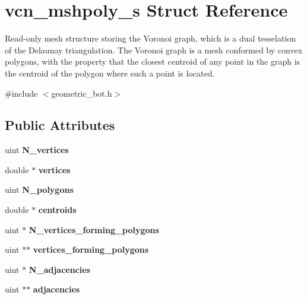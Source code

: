 \hypertarget{structvcn__mshpoly__s}{\section{vcn\+\_\+mshpoly\+\_\+s Struct Reference}
\label{structvcn__mshpoly__s}
}


Read-\/only mesh structure storing the Voronoi graph, which is a dual tesselation of the Delaunay triangulation. The Voronoi graph is a mesh conformed by convex polygons, with the property that the closest centroid of any point in the graph is the centroid of the polygon where such a point is located.  




{\ttfamily \#include $<$geometric\+\_\+bot.\+h$>$}

\subsection*{Public Attributes}
\begin{DoxyCompactItemize}
\item 
\hypertarget{structvcn__mshpoly__s_ab2dc55f45831c2180482884f27f10b10}{uint {\bfseries N\+\_\+vertices}}\label{structvcn__mshpoly__s_ab2dc55f45831c2180482884f27f10b10}

\item 
\hypertarget{structvcn__mshpoly__s_a8d7275ce0a1675389482fb06f8fa564c}{double $\ast$ {\bfseries vertices}}\label{structvcn__mshpoly__s_a8d7275ce0a1675389482fb06f8fa564c}

\item 
\hypertarget{structvcn__mshpoly__s_ad561705ab311c24ee82e131fcaf17573}{uint {\bfseries N\+\_\+polygons}}\label{structvcn__mshpoly__s_ad561705ab311c24ee82e131fcaf17573}

\item 
\hypertarget{structvcn__mshpoly__s_a772256fc6e3ab573a74f5ca8bd1e6134}{double $\ast$ {\bfseries centroids}}\label{structvcn__mshpoly__s_a772256fc6e3ab573a74f5ca8bd1e6134}

\item 
\hypertarget{structvcn__mshpoly__s_a32359f244d0be09a254ddd2b4334519b}{uint $\ast$ {\bfseries N\+\_\+vertices\+\_\+forming\+\_\+polygons}}\label{structvcn__mshpoly__s_a32359f244d0be09a254ddd2b4334519b}

\item 
\hypertarget{structvcn__mshpoly__s_ab7b6c4c0c6d47a6e6ebd9547824f2e36}{uint $\ast$$\ast$ {\bfseries vertices\+\_\+forming\+\_\+polygons}}\label{structvcn__mshpoly__s_ab7b6c4c0c6d47a6e6ebd9547824f2e36}

\item 
\hypertarget{structvcn__mshpoly__s_a576204c105e386af89132e8d0a8b6bbd}{uint $\ast$ {\bfseries N\+\_\+adjacencies}}\label{structvcn__mshpoly__s_a576204c105e386af89132e8d0a8b6bbd}

\item 
\hypertarget{structvcn__mshpoly__s_aee68d886d01d07dbf52ef0bef740f9e6}{uint $\ast$$\ast$ {\bfseries adjacencies}}\label{structvcn__mshpoly__s_aee68d886d01d07dbf52ef0bef740f9e6}

\end{DoxyCompactItemize}



